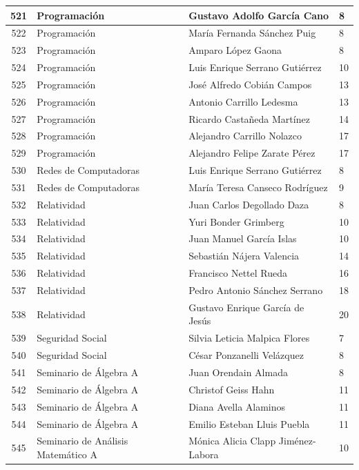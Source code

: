 {\begin{longtable}{|c|p{6.5cm}|p{5cm}|p{1.5cm}|}
  521 & Programación & Gustavo Adolfo García Cano & 8 \\ \hline 
  522 & Programación & María Fernanda Sánchez Puig & 8 \\ \hline 
  523 & Programación & Amparo López Gaona & 8 \\ \hline 
  524 & Programación & Luis Enrique Serrano Gutiérrez & 10 \\ \hline 
  525 & Programación & José Alfredo Cobián Campos & 13 \\ \hline 
  526 & Programación & Antonio Carrillo Ledesma & 13 \\ \hline 
  527 & Programación & Ricardo Castañeda Martínez & 14 \\ \hline 
  528 & Programación & Alejandro Carrillo Nolazco & 17 \\ \hline 
  529 & Programación & Alejandro Felipe Zarate Pérez & 17 \\ \hline 
  530 & Redes de Computadoras & Luis Enrique Serrano Gutiérrez & 8 \\ \hline 
  531 & Redes de Computadoras & María Teresa Canseco Rodríguez & 9 \\ \hline 
  532 & Relatividad & Juan Carlos Degollado Daza & 8 \\ \hline 
  533 & Relatividad & Yuri Bonder Grimberg & 10 \\ \hline 
  534 & Relatividad & Juan Manuel García Islas & 10 \\ \hline 
  535 & Relatividad & Sebastián Nájera Valencia & 14 \\ \hline 
  536 & Relatividad & Francisco Nettel Rueda & 16 \\ \hline 
  537 & Relatividad & Pedro Antonio Sánchez Serrano & 18 \\ \hline 
  538 & Relatividad & Gustavo Enrique García de Jesús & 20 \\ \hline 
  539 & Seguridad Social & Silvia Leticia Malpica Flores & 7 \\ \hline 
  540 & Seguridad Social & César Ponzanelli Velázquez & 8 \\ \hline 
  541 & Seminario de Álgebra A & Juan Orendain Almada & 8 \\ \hline 
  542 & Seminario de Álgebra A & Christof Geiss Hahn & 11 \\ \hline 
  543 & Seminario de Álgebra A & Diana Avella Alaminos & 11 \\ \hline 
  544 & Seminario de Álgebra A & Emilio Esteban Lluis Puebla & 11 \\ \hline 
  545 & Seminario de Análisis Matemático A & Mónica Alicia Clapp Jiménez-Labora & 10 \\ \hline 

\end{longtable}}
